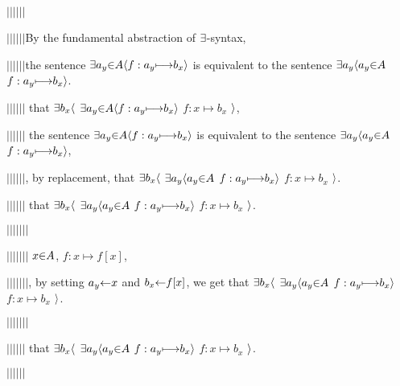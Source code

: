 $|$\hs$|$\hs$|$\hs$|$\hs$|$\hs$|$\hs \par
$|$\hs$|$\hs$|$\hs$|$\hs$|$\hs$|$\hs By the fundamental abstraction of $\a\exists$-syntax, \par
$|$\hs$|$\hs$|$\hs$|$\hs$|$\hs$|$\hs the sentence $\a\exists a_y \p\in A \a\langle f: a_y \mapsto b_x \a\rangle$ is equivalent to the sentence $\a\exists a_y \a\langle a_y \p\in A$  $f: a_y \mapsto b_x \a\rangle$. \par
$|$\hs$|$\hs$|$\hs$|$\hs$|$\hs$|$\hs {}  that $\a\exists b_x \a\langle$ $\a\exists a_y \p\in A \a\langle f: a_y \mapsto b_x \a\rangle$  $f: x \mapsto b_x$ $\a\rangle$, \par
$|$\hs$|$\hs$|$\hs$|$\hs$|$\hs$|$\hs {} the sentence $\a\exists a_y \p\in A \a\langle f: a_y \mapsto b_x \a\rangle$ is equivalent to the sentence $\a\exists a_y \a\langle a_y \p\in A$  $f: a_y \mapsto b_x \a\rangle$, \par
$|$\hs$|$\hs$|$\hs$|$\hs$|$\hs$|$\hs {}, by replacement,  that $\a\exists b_x \a\langle$ $\a\exists a_y \a\langle a_y \p\in A$  $f: a_y \mapsto b_x \a\rangle$  $f: x \mapsto b_x$ $\a\rangle$. \par
$|$\hs$|$\hs$|$\hs$|$\hs$|$\hs$|$\hs {} that $\a\exists b_x \a\langle$ $\a\exists a_y \a\langle a_y \p\in A$  $f: a_y \mapsto b_x \a\rangle$  $f: x \mapsto b_x$ $\a\rangle$. \par

$|$\hs$|$\hs$|$\hs$|$\hs$|$\hs$|$\hs$|$\hs \par
$|$\hs$|$\hs$|$\hs$|$\hs$|$\hs$|$\hs$|$\hs {} $x \p\in \g A$,  $f: x \mapsto f[x]$, \par
$|$\hs$|$\hs$|$\hs$|$\hs$|$\hs$|$\hs$|$\hs {}, by setting $a_y \p\leftarrow x$ and $b_x \p\leftarrow f[x]$, we get that $\a\exists b_x \a\langle$ $\a\exists a_y \a\langle a_y \p\in A$  $f: a_y \mapsto b_x \a\rangle$  $f: x \mapsto b_x$ $\a\rangle$. \par
$|$\hs$|$\hs$|$\hs$|$\hs$|$\hs$|$\hs$|$\hs \par

$|$\hs$|$\hs$|$\hs$|$\hs$|$\hs$|$\hs {} that $\a\exists b_x \a\langle$ $\a\exists a_y \a\langle a_y \p\in A$  $f: a_y \mapsto b_x \a\rangle$  $f: x \mapsto b_x$ $\a\rangle$. \par
$|$\hs$|$\hs$|$\hs$|$\hs$|$\hs$|$\hs \par

